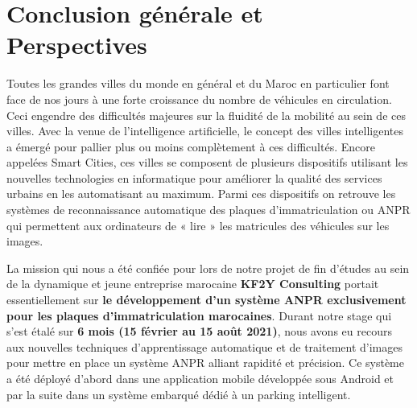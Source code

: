 \chapter*{Conclusion générale et Perspectives}
Toutes les grandes villes du monde en général et du Maroc en particulier font face de nos jours à une forte croissance du nombre de véhicules en circulation. Ceci engendre des difficultés majeures sur la fluidité de la mobilité au sein de ces villes. Avec la venue de l’intelligence artificielle, le concept des villes intelligentes a émergé pour pallier plus ou moins complètement à ces difficultés. Encore appelées Smart Cities, ces villes se composent de plusieurs dispositifs utilisant les nouvelles technologies en informatique pour améliorer la qualité des services urbains en les automatisant au maximum. Parmi ces dispositifs on retrouve les systèmes de reconnaissance automatique des plaques d’immatriculation  ou ANPR qui permettent aux ordinateurs de « lire » les matricules des véhicules sur les images. 


La mission qui nous a été confiée pour lors de notre projet de fin d’études au sein de la dynamique et jeune entreprise marocaine \textbf{KF2Y Consulting} portait essentiellement sur \textbf{le développement d’un système ANPR exclusivement pour les plaques d’immatriculation marocaines}. Durant notre stage qui s’est étalé sur \textbf{6 mois (15 février au 15 août 2021)}, nous avons eu recours aux nouvelles techniques d’apprentissage automatique et de traitement d’images  pour mettre en place un système ANPR alliant rapidité et précision. Ce système a été déployé d’abord dans une application mobile développée sous Android et par la suite dans un système embarqué dédié à un parking intelligent.


